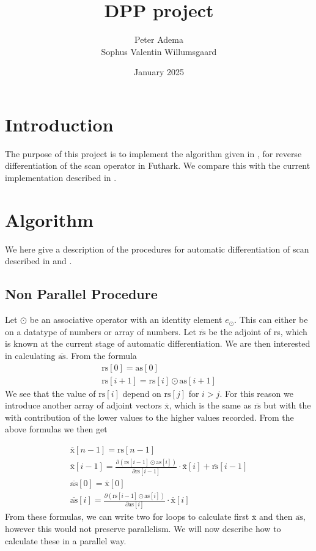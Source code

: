 \documentclass{article}
\title{DPP project}
\author{Peter Adema \\
Sophus Valentin Willumsgaard}
\date{January 2025}
\newcommand{\ors}{\overline{\text{rs}}}
\newcommand{\rs}{\text{rs}}
\newcommand{\oas}{\overline{\text{as}}}
\newcommand{\xo}{\overline{\text{x}}}
\newcommand{\as}{\text{as}}
\begin{document}
\maketitle
\tableofcontents
\section{Introduction}
The purpose of this project is to implement the algorithm given in \cite{PPAD}, for reverse
differentiation of the scan operator in Futhark.
We compare this with the current implementation described in \cite{Futhark}.
\section{Algorithm}
We here give a description of the procedures for automatic differentiation of
scan described in \cite{PPAD} and \cite{Futhark}.

\subsection{Non Parallel Procedure}
Let \(\odot\) be an associative operator with an identity element \(e_{\odot}\).
This can either be on a datatype of numbers or array of numbers.
Let \(\ors\) be the adjoint of rs, which is known at the current stage of
automatic differentiation.
We are then interested in calculating \(\oas\).
From the formula
\begin{align*}
	\rs [0] = \as[0] \\
	\rs [i+1] = \rs[i] \odot \as[i+1]
\end{align*}
We see that the value of \(\rs[i]\) depend on \(\rs[j]\) for \(i>j\).
For this reason we introduce another array of adjoint vectors \(\xo\),
which is the same as \(\ors\) but with the with contribution of the lower
values to the higher values recorded.
From the above formulas we then get

\begin{align*}
	\xo [n-1] = \rs [n-1]      \\
	\xo [i-1] = \frac{\partial (\rs [i-1] \odot \as[i])}{\partial \rs[i-1]}
	\cdot \xo[i]   + \ors[i-1] \\
	\oas [0] = \xo[0]          \\
	\oas [i] = \frac{\partial (\rs [i-1] \odot \as[i])}{\partial \as[i]}
	\cdot
	\xo[i]
\end{align*}
From these formulas, we can write two for loops to calculate first \(\xo\)
and then \(\oas\),
however this would not preserve parallelism. We will now describe how to
calculate these in a parallel way.
\end{document}

